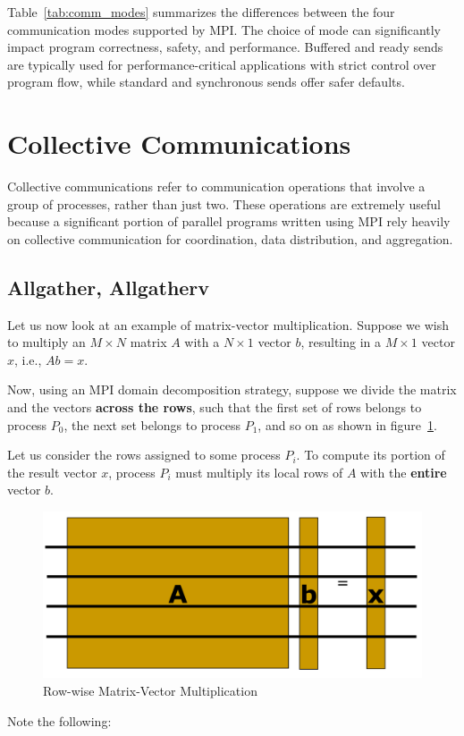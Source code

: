 \documentclass[12pt]{book}
\begin{document}
Table~\ref{tab:comm_modes} summarizes the differences between the four communication modes supported by MPI. The choice of mode can significantly impact program correctness, safety, and performance. Buffered and ready sends are typically used for performance-critical applications with strict control over program flow, while standard and synchronous sends offer safer defaults.

\section{Collective Communications}
Collective communications refer to communication operations that involve a group of processes, rather than just two. These operations are extremely useful because a significant portion of parallel programs written using MPI rely heavily on collective communication for coordination, data distribution, and aggregation.


\subsection{Allgather, Allgatherv}

Let us now look at an example of matrix-vector multiplication. Suppose we wish to multiply an $M \times N$ matrix $A$ with a $N \times 1$ vector $b$, resulting in a $M \times 1$ vector $x$, i.e., $Ab = x$.

Now, using an MPI domain decomposition strategy, suppose we divide the matrix and the vectors \textbf{across the rows}, such that the first set of rows belongs to process $P_0$, the next set belongs to process $P_1$, and so on as shown in figure~\ref{fig:row-wise}.

Let us consider the rows assigned to some process $P_i$. To compute its portion of the result vector $x$, process $P_i$ must multiply its local rows of $A$ with the \textbf{entire} vector $b$. 
\begin{figure}
    \centering
    \includegraphics[width=0.5\linewidth]{images/Row-wise.png}
    \caption{Row-wise Matrix-Vector Multiplication}
    \label{fig:row-wise}
\end{figure}
Note the following:
\end{document}
